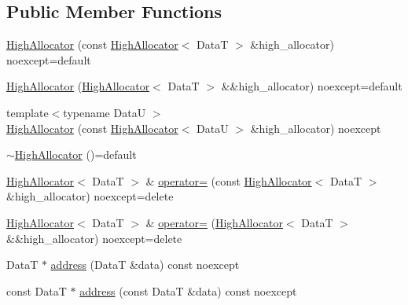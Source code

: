 \subsection*{Public Member Functions}
\begin{DoxyCompactItemize}
\item 
\hyperlink{structmage_1_1_double_ended_memory_stack_1_1_high_allocator_a2add3798ed5b619bc1e44885de0325cd}{High\+Allocator} (const \hyperlink{structmage_1_1_double_ended_memory_stack_1_1_high_allocator}{High\+Allocator}$<$ DataT $>$ \&high\+\_\+allocator) noexcept=default
\item 
\hyperlink{structmage_1_1_double_ended_memory_stack_1_1_high_allocator_a8124c4d3052cd9e3b368ecbbc89a35e1}{High\+Allocator} (\hyperlink{structmage_1_1_double_ended_memory_stack_1_1_high_allocator}{High\+Allocator}$<$ DataT $>$ \&\&high\+\_\+allocator) noexcept=default
\item 
{\footnotesize template$<$typename DataU $>$ }\\\hyperlink{structmage_1_1_double_ended_memory_stack_1_1_high_allocator_a6210e1fbac98efbf26ddf6cbe8fe6be8}{High\+Allocator} (const \hyperlink{structmage_1_1_double_ended_memory_stack_1_1_high_allocator}{High\+Allocator}$<$ DataU $>$ \&high\+\_\+allocator) noexcept
\item 
\hyperlink{structmage_1_1_double_ended_memory_stack_1_1_high_allocator_ae329a13c09bf81bddcf708239bbe26da}{$\sim$\+High\+Allocator} ()=default
\item 
\hyperlink{structmage_1_1_double_ended_memory_stack_1_1_high_allocator}{High\+Allocator}$<$ DataT $>$ \& \hyperlink{structmage_1_1_double_ended_memory_stack_1_1_high_allocator_a98575ee1722ef7a4f1193922bba417f8}{operator=} (const \hyperlink{structmage_1_1_double_ended_memory_stack_1_1_high_allocator}{High\+Allocator}$<$ DataT $>$ \&high\+\_\+allocator) noexcept=delete
\item 
\hyperlink{structmage_1_1_double_ended_memory_stack_1_1_high_allocator}{High\+Allocator}$<$ DataT $>$ \& \hyperlink{structmage_1_1_double_ended_memory_stack_1_1_high_allocator_af4660cee754955e0b5149595c541b1a7}{operator=} (\hyperlink{structmage_1_1_double_ended_memory_stack_1_1_high_allocator}{High\+Allocator}$<$ DataT $>$ \&\&high\+\_\+allocator) noexcept=delete
\item 
DataT $\ast$ \hyperlink{structmage_1_1_double_ended_memory_stack_1_1_high_allocator_a5d2532bb8ebb4919271a312e3a872579}{address} (DataT \&data) const noexcept
\item 
const DataT $\ast$ \hyperlink{structmage_1_1_double_ended_memory_stack_1_1_high_allocator_ab88c9b0e885ee1cc1aaaad2194ae7910}{address} (const DataT \&data) const noexcept

\end{DoxyCompactItemize}
